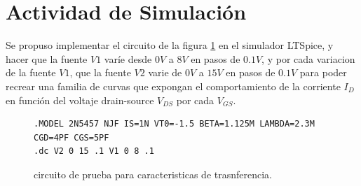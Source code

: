 \section{Actividad de Simulación}
    Se propuso implementar el circuito de la figura \ref{crkt:jfet-transf} en el simulador LTSpice, y hacer que la fuente
    $V1$ varíe desde $0V$ a $8V$ en pasos de $0.1V$, y por cada variacion de la fuente $V1$, que la fuente $V2$ varie de
    $0V$ a $15V$ en pasos de $0.1V$ para poder recrear una familia de curvas que expongan el comportamiento de la
    corriente $I_D$ en función del voltaje drain-source $V_{DS}$ por cada $V_{GS}$.
    \begin{figure}[!ht]
      \centering
      \begin{minipage}{0.45\textwidth}
        \caption{circuito de prueba para caracteristicas de trasnferencia.}
        \label{crkt:jfet-transf}
      \end{minipage}
      \hfill
      \begin{minipage}{0.45\textwidth}
        \begin{lstlisting}[style=ltspice, caption={Parámetros de simulación LTspice}, label=list:jfet-transf]
.MODEL 2N5457 NJF IS=1N VT0=-1.5 BETA=1.125M LAMBDA=2.3M CGD=4PF CGS=5PF
.dc V2 0 15 .1 V1 0 8 .1
        \end{lstlisting}
      \end{minipage}
    \end{figure}

